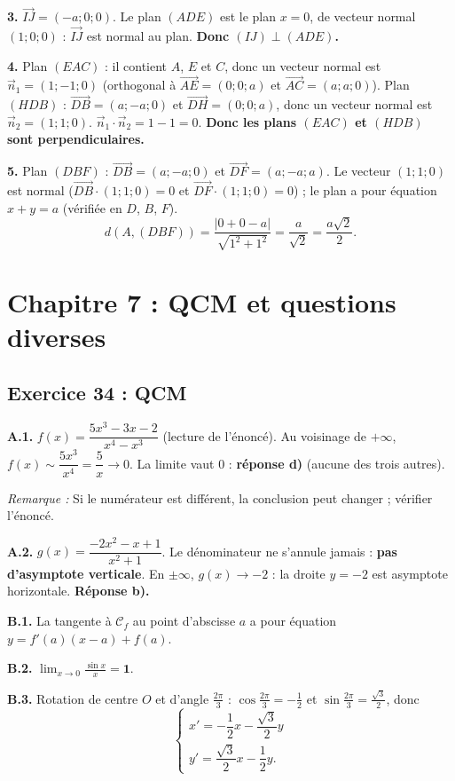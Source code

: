 \documentclass[11pt,a4paper]{article}
\newcommand{\vect}[1]{\overrightarrow{#1}}
\newenvironment{rem}{\par\medskip\noindent\textit{Remarque :}\quad}{\par\medskip}
\begin{document}
\textbf{3.} $\vect{IJ}=\left(-a;0;0\right)$. Le plan $(ADE)$ est le plan $x=0$, de vecteur normal $(1;0;0)$ :
$\vect{IJ}$ est normal au plan. \textbf{Donc $(IJ)\perp(ADE)$.}

\textbf{4.} Plan $(EAC)$ : il contient $A$, $E$ et $C$, donc un vecteur normal est $\vect n_1=(1;-1;0)$
(orthogonal \`a $\vect{AE}=(0;0;a)$ et $\vect{AC}=(a;a;0)$).
Plan $(HDB)$ : $\vect{DB}=(a;-a;0)$ et $\vect{DH}=(0;0;a)$, donc un vecteur normal est $\vect n_2=(1;1;0)$.
$\vect n_1\cdot\vect n_2=1-1=0$. \textbf{Donc les plans $(EAC)$ et $(HDB)$ sont perpendiculaires.}

\textbf{5.} Plan $(DBF)$ : $\vect{DB}=(a;-a;0)$ et $\vect{DF}=(a;-a;a)$. Le vecteur $(1;1;0)$ est normal ($\vect{DB}\cdot(1;1;0)=0$ et
$\vect{DF}\cdot(1;1;0)=0$) ; le plan a pour \'equation $x+y=a$ (v\'erifi\'ee en $D$, $B$, $F$).
\[
d(A,(DBF))=\frac{|0+0-a|}{\sqrt{1^2+1^2}}=\frac{a}{\sqrt2}=\frac{a\sqrt2}{2}.
\]

\section{Chapitre 7 : QCM et questions diverses}

\subsection{Exercice 34 : QCM}

\textbf{A.1.} $f(x)=\dfrac{5x^3-3x-2}{x^4-x^3}$ (lecture de l'\'enonc\'e). Au voisinage de $+\infty$, $f(x)\sim\dfrac{5x^3}{x^4}=\dfrac5x\to0$.
La limite vaut $0$ : \textbf{r\'eponse d)} (aucune des trois autres).
\begin{rem} Si le num\'erateur est diff\'erent, la conclusion peut changer ; v\'erifier l'\'enonc\'e.\end{rem}

\textbf{A.2.} $g(x)=\dfrac{-2x^2-x+1}{x^2+1}$. Le d\'enominateur ne s'annule jamais : \textbf{pas d'asymptote verticale}.
En $\pm\infty$, $g(x)\to-2$ : la droite $y=-2$ est asymptote horizontale. \textbf{R\'eponse b).}

\textbf{B.1.} La tangente \`a $\mathcal C_f$ au point d'abscisse $a$ a pour \'equation $\boxed{y=f'(a)(x-a)+f(a)}$.

\textbf{B.2.} $\displaystyle\lim_{x\to0}\frac{\sin x}{x}=\mathbf{1}$.

\textbf{B.3.} Rotation de centre $O$ et d'angle $\frac{2\pi}{3}$ : $\cos\frac{2\pi}{3}=-\frac12$ et $\sin\frac{2\pi}{3}=\frac{\sqrt3}{2}$, donc
\[
\begin{cases}
x'=-\dfrac12x-\dfrac{\sqrt3}{2}y\\[6pt]
y'=\dfrac{\sqrt3}{2}x-\dfrac12y.
\end{cases}
\]
\end{document}
